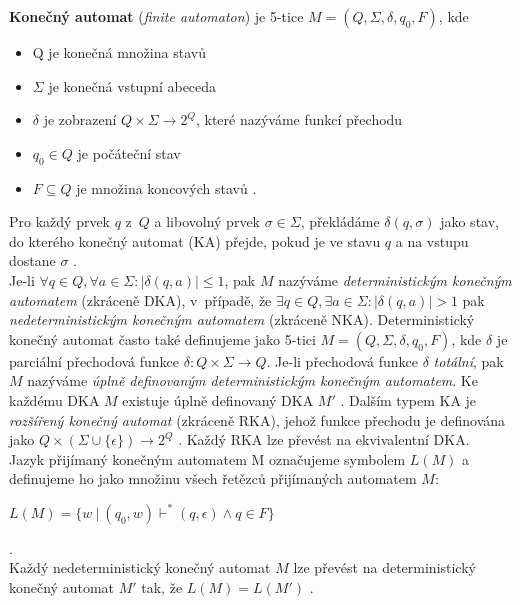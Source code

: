\textbf{Konečný automat} (\textit{finite automaton}) je 5-tice $M = (Q, \Sigma, \delta, q_0, F)$, kde
\begin{itemize}
\item Q je konečná množina stavů
\item $\Sigma$ je konečná vstupní abeceda
\item $\delta$ je zobrazení $Q \times \Sigma \rightarrow 2^Q$, které nazýváme funkcí přechodu
\item $q_0 \in Q$ je počáteční stav
\item $F \subseteq Q$ je množina koncových stavů \cite[str. 21]{TIN2013}.
\end{itemize}
\vspace*{\baselineskip}
Pro každý prvek $q$ z~$Q$ a libovolný prvek $\sigma \in \Sigma$, překládáme $\delta(q, \sigma)$
jako stav, do kterého \mbox{konečný} automat (KA) přejde, pokud je ve stavu $q$ a na vstupu dostane $\sigma$ \cite[str. 53]{Martin2011}. \\

Je-li $\forall q \in Q, \forall a \in \Sigma: |\delta(q, a)| \leq 1$, pak $M$ nazýváme \textit{deterministickým konečným automatem} 
(zkráceně DKA), v~případě, že $\exists q \in Q, \exists a \in \Sigma:  |\delta(q, a)| >1$ pak \textit{nedeterministickým konečným automatem} 
(zkráceně NKA). Deterministický konečný automat často také definujeme jako 5-tici $M = (Q, \Sigma, \delta, q_0, F)$, kde $\delta$ je parciální 
přechodová funkce $\delta: Q \times \Sigma \rightarrow Q$. 
Je-li přechodová funkce $\delta$ \textit{totální}, pak $M$ nazýváme \textit{úplně definovaným deterministickým konečným automatem}. Ke každému 
DKA $M$ existuje  úplně definovaný DKA $M'$ \cite[str. 21]{TIN2013}.
Dalším typem KA je \textit{rozšířený konečný automat} (zkráceně RKA), jehož funkce přechodu je definována jako 
$Q \times (\Sigma \cup \{\epsilon\}) \rightarrow 2^Q$ \cite[str. 43]{TIN2013}. Každý RKA lze převést na ekvivalentní DKA.\\

Jazyk přijímaný konečným automatem M označujeme symbolem $L(M)$ a definujeme ho jako množinu všech řetězců přijímaných automatem $M$:
\begin{center}
$L(M) = \{w \ | \ (q_0, w) \vdash^* (q, \epsilon) \wedge q \in F\}$
\end{center}
\cite[str. 22]{TIN2013}. \\

Každý nedeterministický konečný automat $M$ lze převést na deterministický konečný \mbox{automat} $M'$ tak, že 
$L(M) = L(M')$ \cite[str. 23]{TIN2013}. \\

